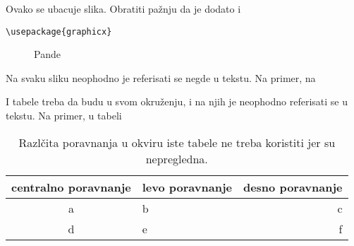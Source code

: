 \begin{primer} Ovako se ubacuje slika. Obratiti pažnju da je dodato i 
\begin{verbatim}
\usepackage{graphicx}
\end{verbatim}

\begin{figure}[h!]
\begin{center}
\end{center}
\caption{Pande}
\label{fig:pande}
\end{figure}

Na svaku sliku neophodno je referisati se negde u tekstu. Na primer, na %
\end{primer}

\begin{primer} I tabele treba da budu u svom okruženju, i na njih je neophodno referisati se u tekstu. Na primer, u tabeli%

\begin{table}[h!]
\begin{center}
\caption{Razlčita poravnanja u okviru iste tabele ne treba koristiti jer su nepregledna.}
\begin{tabular}{|c|l|r|} \hline
centralno poravnanje& levo poravnanje& desno poravnanje\\ \hline
a &b&c\\ \hline
d &e&f\\ \hline
\end{tabular}
\label{tab:tabela1}
\end{center}
\end{table}

\end{primer}